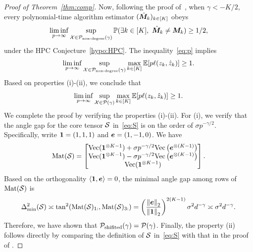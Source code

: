 \documentclass[lettersize,onecolumn,journal]{IEEEtran}
\theoremstyle{definition}
\theoremstyle{definition}
\newcommand{\Mat}{\text{Mat}}
\def\fixme#1#2{\textbf{\color{red}[FIXME (#1): #2]}}
\begin{document}
\begin{proof}[Proof of Theorem~\ref{thm:comp}]
Now, following the proof of~\citet[Theorem 7]{han2020exact}, when $\gamma<-K/2$, every polynomial-time algorithm estimator $(\hat {\bm M}_k)_{k\in[K]}$ obeys
\begin{align}\label{eq:p}
\liminf_{p\to \infty} \sup_{\tX\in \tP_{\text{non-degree}}(\gamma)}\mathbb{P}(\exists k \in[K],\  \hat \mM_k \neq \mM_k)\geq 1/2,
\end{align}
under the HPC Conjecture~\ref{hypo:HPC}.
The inequality~\eqref{eq:p} implies
\[
\liminf_{p\to \infty} \sup_{\mathcal{X}\in \mathcal{P}_{\text{non-degree}}(\gamma)}\max_{k\in[K]}\mathbb{E}[p\ell(z_k, \hat z_k)]\geq 1.
\]
Based on properties (i)-(ii), we conclude that
\[
\liminf_{p\to \infty} \sup_{\mathcal{X}\in \mathcal{P}(\gamma)}\max_{k\in[K]}\mathbb{E}[p\ell(z_k, \hat z_k)]\geq 1.
\]
We complete the proof by verifying the properties (i)-(ii). For (i), we verify that the angle gap for the core tensor $\mathcal{S}$ in~\eqref{eq:S} is on the order of $\sigma p^{-\gamma/2}$. Specifically, write $\mathbf{1}=(1,1,1)$ and $\bm{e}=(1,-1,0)$. We have
\[
\Mat(\tS)=
\begin{bmatrix}
\text{Vec}(\mone^{\otimes K-1})+\sigma p^{-\gamma/2}\text{Vec}\left(\me^{\otimes (K-1)}\right) \\
\text{Vec}(\mone^{\otimes K-1})-\sigma p^{-\gamma/2}\text{Vec}\left(\me^{\otimes (K-1)}\right) \\
\text{Vec}(\mone^{\otimes K-1})
\end{bmatrix}.
\]
Based on the orthogonality $\langle \mathbf{1}, \bm{e}\rangle=0$, the minimal angle gap among rows of $\Mat(\tS)$ is
\begin{align}
\Delta^2_{\min}(\tS)\asymp \tan^2(\Mat(\tS)_{1:}, \Mat(\tS)_{3:})
=\left(\onorm{\me}_2 \over \onorm{\mone}_2\right)^{2(K-1)} \sigma^2 d^{-\gamma}\asymp \sigma^2 d^{-\gamma}.
\end{align}
Therefore, we have shown that $\mathcal{P}_{\text{shifited}}(\gamma)=\mathcal{P}(\gamma)$. Finally, the property (ii) follows directly by comparing the definition of $\mathcal{S}$ in~\eqref{eq:S} with that in the proof of \citet[Theorem 7]{han2020exact}. 
\end{proof}

\end{document}

